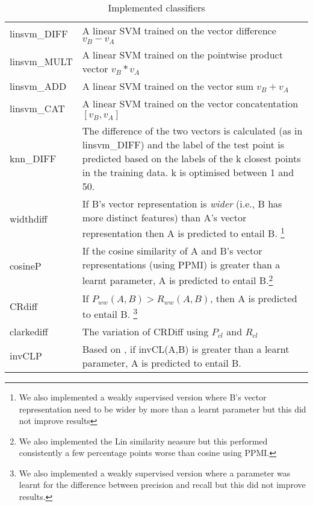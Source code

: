 \documentclass[11pt]{article}
\begin{document}
\begin{table}[ht]
\centering
\begin{tabular}{p{2cm} p{5.5cm}}
linsvm\_DIFF&A linear SVM trained on the vector difference $v_B - v_A$\\
linsvm\_MULT&A linear SVM trained on the pointwise product vector $v_B * v_A$\\
linsvm\_ADD&A linear SVM trained on the vector sum $v_B + v_A$\\
linsvm\_CAT&A linear SVM trained on the vector concatentation $[v_B,v_A]$\\
knn\_DIFF&The difference of the two vectors is calculated (as in linsvm\_DIFF) and the label of the test point is predicted based on the labels of the k closest points in the training data. k is optimised between 1 and 50.\\
widthdiff&If B's vector representation is \textit{wider} (i.e., B has more distinct features) than A's vector representation then A is predicted to entail B. \footnote{We also implemented a weakly supervised version where B's vector representation need to be wider by more than a learnt parameter but this did not improve results}\\
cosineP&If the cosine similarity of A and B's vector representations (using PPMI) is greater than a learnt parameter, A is predicted to entail B.\footnote{We also implemented the Lin similarity neasure \cite{Lin1998} but this performed consistently a few percentage points worse than cosine using PPMI.} \\
CRdiff&If $P_{ww}(A,B) > R_{ww}(A,B)$, then A is predicted to entail B.  \footnote{We also implemented a weakly supervised version where a parameter was learnt for the difference between precision and recall but this did not improve results.}\\
clarkediff&The \cite{Clarke2007} variation of CRDiff using $P_{cl}$ and $R_{cl}$\\
invCLP&Based on \cite{Lenci2012}, if invCL(A,B) is greater than a learnt parameter, A is predicted to entail B.\\
\end{tabular}
\caption{Implemented classifiers}
\label{table:classifiers}
\end{table}
\end{document}
